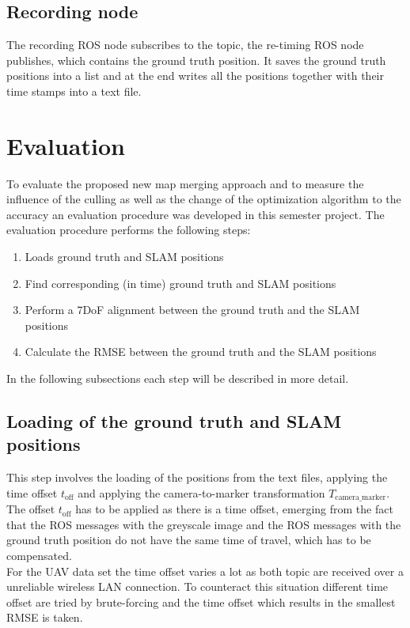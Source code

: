 \subsection{Recording node}
\label{subsec:record_node}
The recording \ac{ROS} node subscribes to the topic, the re-timing \ac{ROS} node publishes, which contains the ground truth position. It saves the ground truth positions into a list and at the end writes all the positions together with their time stamps into a text file.

\section{Evaluation}
To evaluate the proposed new map merging approach and to measure the influence of the culling as well as the change of the optimization algorithm to the accuracy an evaluation procedure was developed in this semester project. The evaluation procedure performs the following steps:

\begin{enumerate}
  \item Loads ground truth and \ac{SLAM} positions
  \item Find corresponding (in time) ground truth and \ac{SLAM} positions
  \item Perform a 7DoF alignment between the ground truth and the \ac{SLAM} positions
  \item Calculate the \acf{RMSE} between the ground truth and the \ac{SLAM} positions
\end{enumerate}

In the following subsections each step will be described in more detail.

\subsection{Loading of the ground truth and \ac{SLAM} positions}
This step involves the loading of the positions from the text files, applying the time offset $t_{\text{off}}$ and applying the camera-to-marker transformation $T_{\text{camera\_marker}}$.\\

The offset $t_{\text{off}}$ has to be applied as there is a time offset, emerging from the fact that the \ac{ROS} messages with the greyscale image and the \ac{ROS} messages with the ground truth position do not have the same time of travel, which has to be compensated.\\
For the \ac{UAV} data set the time offset varies a lot as both topic are received over a unreliable wireless LAN connection. To counteract this situation different time offset are tried by brute-forcing and the time offset which results in the smallest \ac{RMSE} is taken.\\ 

